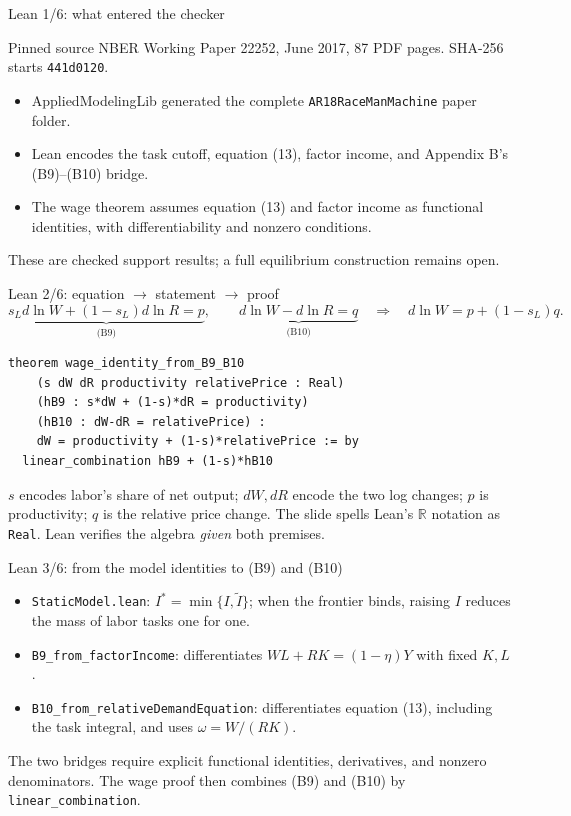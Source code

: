 \begin{frame}{Lean 1/6: what entered the checker}
\begin{block}{Pinned source}
NBER Working Paper 22252, June 2017, 87 PDF pages. SHA-256 starts \texttt{441d0120}.
\end{block}
\begin{itemize}
\item AppliedModelingLib generated the complete \texttt{AR18RaceManMachine} paper folder.
\item Lean encodes the task cutoff, equation (13), factor income, and Appendix B's (B9)--(B10) bridge.
\item The wage theorem assumes equation (13) and factor income as functional identities, with differentiability and nonzero conditions.
\end{itemize}
\vspace{.5em}
These are checked \alert{support results}; a full equilibrium construction remains open.
\end{frame}

\begin{frame}[fragile]{Lean 2/6: equation $\rightarrow$ statement $\rightarrow$ proof}
\vspace{-.5em}
\footnotesize
\[\underbrace{s_L d\ln W+(1-s_L)d\ln R=p}_{\text{(B9)}},\qquad
  \underbrace{d\ln W-d\ln R=q}_{\text{(B10)}}
  \quad\Longrightarrow\quad d\ln W=p+(1-s_L)q.\]
\vspace{-.5em}
\begin{lstlisting}
theorem wage_identity_from_B9_B10
    (s dW dR productivity relativePrice : Real)
    (hB9 : s*dW + (1-s)*dR = productivity)
    (hB10 : dW-dR = relativePrice) :
    dW = productivity + (1-s)*relativePrice := by
  linear_combination hB9 + (1-s)*hB10
\end{lstlisting}
\vspace{-.5em}
\footnotesize $s$ encodes labor's share of net output; $dW,dR$ encode the two log changes; $p$ is productivity; $q$ is the relative price change. The slide spells Lean's $\mathbb R$ notation as \texttt{Real}. Lean verifies the algebra \emph{given} both premises.
\end{frame}

\begin{frame}{Lean 3/6: from the model identities to (B9) and (B10)}
\begin{itemize}
\item \texttt{StaticModel.lean}: $I^*=\min\{I,\widetilde I\}$; when the frontier binds, raising $I$ reduces the mass of labor tasks one for one.
\item \texttt{B9\_from\_factorIncome}: differentiates $WL+RK=(1-\eta)Y$ with fixed $K,L$.
\item \texttt{B10\_from\_relativeDemandEquation}: differentiates equation (13), including the task integral, and uses $\omega=W/(RK)$.
\end{itemize}
\vspace{.4em}
The two bridges require explicit functional identities, derivatives, and nonzero denominators. The wage proof then combines (B9) and (B10) by \texttt{linear\_combination}.
\end{frame}

